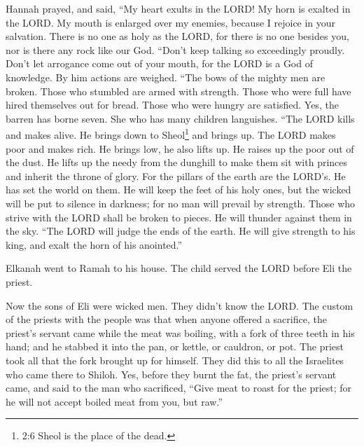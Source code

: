  Hannah prayed, and said, ``My heart exults in the LORD! My
horn is exalted in the LORD. My mouth is enlarged over my enemies,
because I rejoice in your salvation.  There is no one as
holy as the LORD, for there is no one besides you, nor is there any rock
like our God.  ``Don't keep talking so exceedingly proudly.
Don't let arrogance come out of your mouth, for the LORD is a God of
knowledge. By him actions are weighed.  ``The bows of the
mighty men are broken. Those who stumbled are armed with strength.
 Those who were full have hired themselves out for bread.
Those who were hungry are satisfied. Yes, the barren has borne seven.
She who has many children languishes.  ``The LORD kills and
makes alive. He brings down to Sheol\footnote{2:6 Sheol is the place of
  the dead.} and brings up.  The LORD makes poor and makes
rich. He brings low, he also lifts up.  He raises up the
poor out of the dust. He lifts up the needy from the dunghill to make
them sit with princes and inherit the throne of glory. For the pillars
of the earth are the LORD's. He has set the world on them. 
He will keep the feet of his holy ones, but the wicked will be put to
silence in darkness; for no man will prevail by strength. 
Those who strive with the LORD shall be broken to pieces. He will
thunder against them in the sky. ``The LORD will judge the ends of the
earth. He will give strength to his king, and exalt the horn of his
anointed.''

 Elkanah went to Ramah to his house. The child served the
LORD before Eli the priest.

 Now the sons of Eli were wicked men. They didn't know the
LORD.  The custom of the priests with the people was that
when anyone offered a sacrifice, the priest's servant came while the
meat was boiling, with a fork of three teeth in his hand; 
and he stabbed it into the pan, or kettle, or cauldron, or pot. The
priest took all that the fork brought up for himself. They did this to
all the Israelites who came there to Shiloh.  Yes, before
they burnt the fat, the priest's servant came, and said to the man who
sacrificed, ``Give meat to roast for the priest; for he will not accept
boiled meat from you, but raw.''

